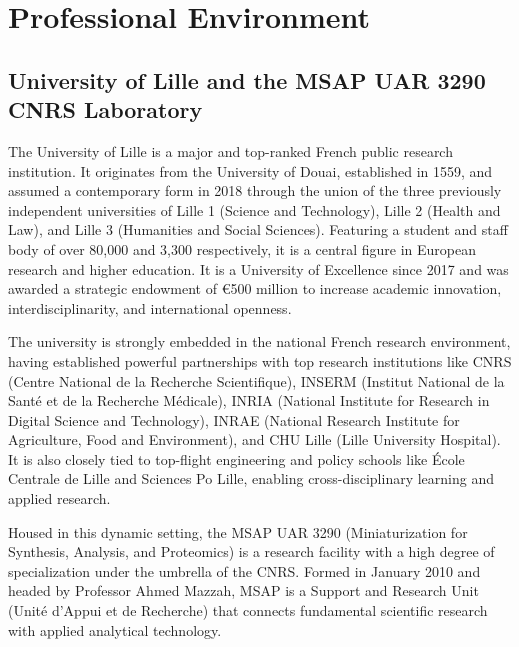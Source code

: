 \documentclass[12pt,a4paper]{report}
\begin{document}
\tableofcontents
\newpage


\chapter{Professional Environment}

\section{University of Lille and the MSAP UAR 3290 CNRS Laboratory}

The University of Lille is a major and top-ranked French public research institution. It
originates from the University of Douai, established in 1559, and assumed a contemporary form in 2018 through the union of the three previously independent universities of Lille 1 (Science and Technology), Lille 2 (Health and Law), and Lille 3 (Humanities and Social Sciences). Featuring a student and staff body of over 80,000 and 3,300 respectively, it is a central figure in European research and higher education. It is a University of Excellence since 2017 and was awarded a strategic endowment of €500 million to increase academic innovation, interdisciplinarity, and international openness.

The university is strongly embedded in the national French research environment, having established powerful partnerships with top research institutions like CNRS (Centre National de la Recherche Scientifique), INSERM (Institut National de la Santé et de la Recherche Médicale), INRIA (National Institute for Research in Digital Science and Technology), INRAE (National Research Institute for Agriculture, Food and Environment), and CHU Lille (Lille University Hospital). It is also closely tied to top-flight engineering and policy schools like École Centrale de Lille and Sciences Po Lille, enabling cross-disciplinary learning and applied research.


Housed in this dynamic setting, the MSAP UAR 3290 (Miniaturization for Synthesis, Analysis, and Proteomics) is a research facility with a high degree of specialization under the umbrella of the CNRS. Formed in January 2010 and headed by Professor Ahmed Mazzah, MSAP is a Support and Research Unit (Unité d’Appui et de Recherche) that connects fundamental scientific research with applied analytical technology.
\end{document}
